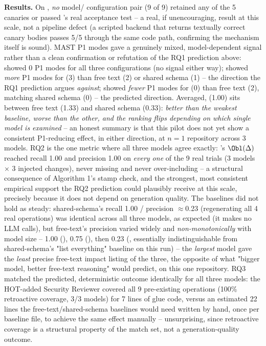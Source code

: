 \noindent\textbf{Results.} On , \emph{no} model/
configuration pair (9 of 9) retained any of the 5 canaries or passed
's real acceptance test -- a real, if unencouraging, result at
this scale, not a pipeline defect (a scripted backend that returns
textually correct canary bodies passes 5/5 through the same code path,
confirming the mechanism itself is sound). MAST P1 modes gave a genuinely
mixed, model-dependent signal rather than a clean confirmation or
refutation of the RQ1 prediction above:  showed
0 P1 modes for all three configurations (no signal either way);
 showed \emph{more} P1 modes for \tool{} (3) than free
text (2) or shared schema (1) -- the direction the RQ1 prediction argues
\emph{against};  showed \emph{fewer} P1
modes for \tool{} (0) than free text (2), matching shared schema (0) --
the predicted direction. Averaged, \tool{} (1.00) sits between free text
(1.33) and shared schema (0.33): \emph{better than the weakest baseline,
worse than the other, and the ranking flips depending on which single
model is examined} -- an honest summary is that this pilot does not yet
show a consistent P1-reducing effect, in either direction, at $n=1$
repository across 3 models. RQ2 is the one metric where all three models
agree exactly: \tool{}'s $\Obl(\Delta)$ reached recall 1.00 and precision
1.00 on \emph{every one} of the 9 real trials (3 models $\times$ 3 injected
changes), never missing and never over-including -- a structural
consequence of Algorithm 1's stamp check, and the strongest, most
consistent empirical support the RQ2 prediction could plausibly
receive at this scale, precisely because it does not depend on generation
quality. The baselines did not hold as steady: shared-schema's recall 1.00
/ precision $\approx$0.23 (regenerating all 4 real operations) was
identical across all three models, as expected (it makes no LLM calls),
but free-text's precision varied widely and \emph{non-monotonically} with
model size -- 1.00 (), 0.75 (),
then 0.23 (, essentially indistinguishable from
shared-schema's "list everything" baseline on this run) -- the
\emph{largest} model gave the \emph{least} precise free-text impact
listing of the three, the opposite of what "bigger model, better
free-text reasoning" would predict, on this one repository. RQ3 matched
the predicted, deterministic outcome identically for all
three models: the HOT-added Security Reviewer covered all 9 pre-existing
operations (100\% retroactive coverage, 3/3 models) for 7 lines of glue
code, versus an estimated 22 lines the free-text/shared-schema baselines
would need written by hand, once per baseline file, to achieve the same
effect manually -- unsurprising, since retroactive coverage is a structural
property of the match set, not a generation-quality outcome.

